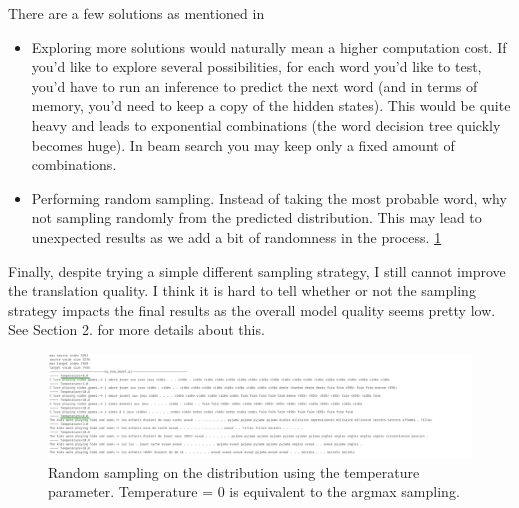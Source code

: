 \documentclass[a4paper]{article}
\begin{document}
There are a few solutions as mentioned in \cite{hugging_face_gen}
\begin{itemize}
\item  Exploring more solutions would naturally mean a higher computation cost. If you'd like to explore several possibilities, for each word you'd like to test, you'd have to run an inference to predict the next word (and in terms of memory, you'd need to keep a copy of the hidden states). This would be quite heavy and leads to exponential combinations (the word decision tree quickly becomes huge). In beam search you may keep only a fixed amount of combinations.
\item  Performing random sampling. Instead of taking the most probable word, why not sampling randomly from the predicted distribution. 
This may lead to unexpected results as we add a bit of randomness in the process. \ref{fig:random_sampling}
\end{itemize}
Finally, despite trying a simple different sampling strategy, I still cannot improve the translation quality. I think it is hard to tell whether or not the sampling strategy impacts the final results as the overall model quality seems pretty low. See Section 2. for more details about this.

\begin{figure}[ht]
    \centering
    \includegraphics[width=0.5\linewidth]{figures/temperature_sampling.png}
    \caption{Random sampling on the distribution using the temperature parameter. Temperature = 0 is equivalent to the argmax sampling.}
    \label{fig:random_sampling}
\end{figure}
\end{document}
